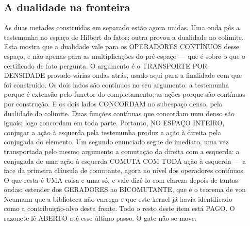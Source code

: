 \documentclass[11pt]{article}
\theoremstyle{definition}\newtheorem{deriv}{Derivação}
\begin{document}
\subsection*{A dualidade na fronteira}As duas metades constru\'idas em separado est\~ao agora unidas. Uma onda p\^os a testemunha no espa\c{c}o de Hilbert do fator; outra provou a dualidade no colimite. Esta mostra que a dualidade vale para os OPERADORES CONT\'INUOS desse espa\c{c}o, e n\~ao apenas para as multiplica\c{c}\~oes do pr\'e-espa\c{c}o --- que \'e sobre o que o certificado de fato pergunta. O argumento \'e o TRANSPORTE POR DENSIDADE provado v\'arias ondas atr\'as, usado aqui para a finalidade com que foi constru\'ido. Os dois lados s\~ao cont\'inuos no seu argumento: a testemunha porque \'e extens\~ao pelo functor do completamento; as a\c{c}\~oes porque s\~ao cont\'inuas por constru\c{c}\~ao. E os dois lados CONCORDAM no subespa\c{c}o denso, pela dualidade do colimite. Duas fun\c{c}\~oes cont\'inuas que concordam num denso s\~ao iguais; logo concordam em toda parte. Portanto, NO ESPA\c{C}O INTEIRO, conjugar a a\c{c}\~ao \`a esquerda pela testemunha produz a a\c{c}\~ao \`a direita pela conjugada do elemento. Um segundo enunciado segue de imediato, uma vez transportada pelo mesmo argumento a comuta\c{c}\~ao da direita com a esquerda: a conjugada de uma a\c{c}\~ao \`a esquerda COMUTA COM TODA a\c{c}\~ao \`a esquerda --- a face da primeira cl\'ausula de comutante, agora no n\'ivel dos operadores cont\'inuos. O que resta \'e UMA coisa e uma s\'o, e vale diz\^e-lo com clareza depois de tantas ondas: estender dos GERADORES ao BICOMUTANTE, que \'e o teorema de von Neumann que a biblioteca n\~ao carrega e que este kernel j\'a havia identificado como a contribui\c{c}\~ao-alvo desta frente. Todo o resto deste item est\'a PAGO. O razonete l\^e ABERTO at\'e esse \'ultimo passo. O gate n\~ao se move.
\end{document}
